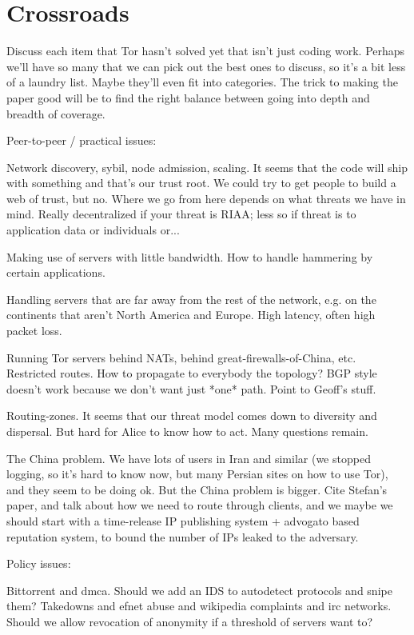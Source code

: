 \documentclass{llncs}
\begin{document}
\section{Crossroads}

Discuss each item that Tor hasn't solved yet that isn't just coding
work.  Perhaps we'll have so many that we can pick out the best ones to
discuss, so it's a bit less of a laundry list. Maybe they'll even fit
into categories. The trick to making the paper good will be to find
the right balance between going into depth and breadth of coverage.


Peer-to-peer / practical issues:

Network discovery, sybil, node admission, scaling. It seems that the code
will ship with something and that's our trust root. We could try to get
people to build a web of trust, but no. Where we go from here depends
on what threats we have in mind. Really decentralized if your threat is
RIAA; less so if threat is to application data or individuals or...

Making use of servers with little bandwidth. How to handle hammering by
certain applications.

Handling servers that are far away from the rest of the network, e.g. on
the continents that aren't North America and Europe. High latency,
often high packet loss.

Running Tor servers behind NATs, behind great-firewalls-of-China, etc.
Restricted routes. How to propagate to everybody the topology? BGP
style doesn't work because we don't want just *one* path. Point to
Geoff's stuff.

Routing-zones. It seems that our threat model comes down to diversity and
dispersal. But hard for Alice to know how to act. Many questions remain.

The China problem. We have lots of users in Iran and similar (we stopped
logging, so it's hard to know now, but many Persian sites on how to use
Tor), and they seem to be doing ok. But the China problem is bigger. Cite
Stefan's paper, and talk about how we need to route through clients,
and we maybe we should start with a time-release IP publishing system +
advogato based reputation system, to bound the number of IPs leaked to the
adversary.


Policy issues:

Bittorrent and dmca. Should we add an IDS to autodetect protocols and
snipe them? Takedowns and efnet abuse and wikipedia complaints and irc
networks. Should we allow revocation of anonymity if a threshold of
servers want to?
\end{document}
